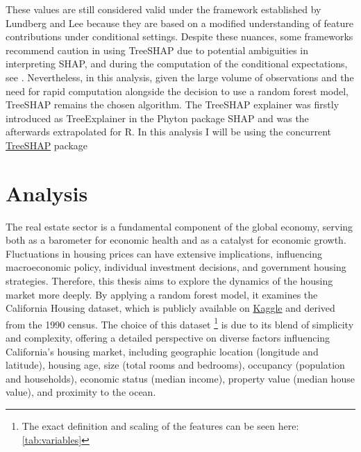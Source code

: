 \documentclass[12pt]{article}
\begin{document}
 These values are still considered valid under the framework established by Lundberg and Lee because they are based on a modified understanding of feature contributions under conditional settings.
Despite these nuances, some frameworks recommend caution in using TreeSHAP due to potential ambiguities in interpreting SHAP, and during the computation of the conditional expectations, see \cite{Aal}. Nevertheless, in this analysis, given the large volume of observations and the need for rapid computation alongside the decision to use a random forest model, TreeSHAP remains the chosen algorithm. The TreeSHAP explainer was firstly introduced as TreeExplainer in the Phyton package SHAP and was the afterwards extrapolated for R. In this analysis I will be using the concurrent \href{https://github.com/ModelOriented/treeshap}{TreeSHAP} package



\section{Analysis}
The real estate sector is a fundamental component of the global economy, serving both as a barometer for economic health and as a catalyst for economic growth. Fluctuations in housing prices can have extensive implications, influencing macroeconomic policy, individual investment decisions, and government housing strategies. Therefore, this thesis aims to explore the dynamics of the housing market more deeply. By applying a random forest model, it examines the California Housing dataset, which is publicly available on \href{https://www.kaggle.com/datasets/camnugent/california-housing-prices}{Kaggle} and derived from the 1990 census.
The choice of this dataset \footnote{The exact definition and scaling of the features can be seen here: \ref{tab:variables}} is due to its blend of simplicity and complexity, offering a detailed perspective on diverse factors influencing California’s housing market, including geographic location (longitude and latitude), housing age, size (total rooms and bedrooms), occupancy (population and households), economic status (median income), property value (median house value), and proximity to the ocean.
\end{document}
